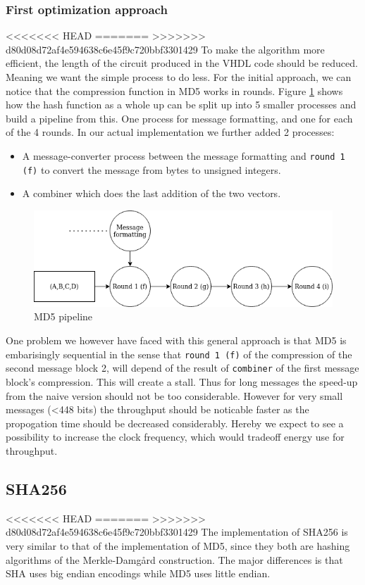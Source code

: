 \documentclass[a4paper]{article}
\begin{document}
\begin{enumerate}
\subsubsection{First optimization approach}
<<<<<<< HEAD
\label{sec:org01b4c61}
=======
\label{sec:org7ae45f1}
>>>>>>> d80d08d72af4e594638c6e45f9c720bbf3301429
To make the algorithm more efficient, the length of the circuit produced in the VHDL code should be reduced. Meaning we want the simple process to do less. For the initial approach, we can notice that the compression function in MD5 works in rounds. Figure \ref{fig:MD5opt1} shows how the hash function as a whole up can be split up into 5 smaller processes and build a pipeline from this. One process for message formatting, and one for each of the 4 rounds. In our actual implementation we further added 2 processes:
\begin{itemize}
\item A message-converter process between the message formatting and \texttt{round 1 (f)} to convert the message from bytes to unsigned integers.
\item A combiner which does the last addition of the two vectors.
\end{itemize}

\begin{figure}[H]
\centering
\includegraphics[width=.9\linewidth]{./Implementation/md5.png}
\caption{\label{fig:MD5opt1}MD5 pipeline}
\end{figure}
One problem we however have faced with this general approach is that MD5 is embarisingly sequential in the sense that \texttt{round 1 (f)} of the compression of the second message block 2, will depend of the result of \texttt{combiner} of the first message block's compression. This will create a stall. Thus for long messages the speed-up from the naive version should not be too considerable. However for very small messages (<448 bits) the throughput should be noticable faster as the propogation time should be decreased considerably. Hereby we expect to see a possibility to increase the clock frequency, which would tradeoff energy use for throughput.
\subsection{SHA256}
<<<<<<< HEAD
\label{sec:orge0a5304}
=======
\label{sec:org8c13fc9}
>>>>>>> d80d08d72af4e594638c6e45f9c720bbf3301429
The implementation of SHA256 is very similar to that of the implementation of MD5,
since they both are hashing algorithms of the Merkle-Damgård construction.
The major differences is that SHA uses big endian encodings while MD5 uses little endian.


\end{enumerate}
\end{document}
